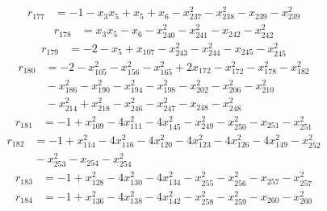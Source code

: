 \[\begin{aligned}
r_{177}&=-1-x_{3}x_{5}+x_{5}+x_{6}-x_{237}^{2}-x_{238}^{2}-x_{239}-x_{239}^{2}
\end{aligned}\]
\[\begin{aligned}
r_{178}&=x_{3}x_{5}-x_{6}-x_{240}^{2}-x_{241}^{2}-x_{242}-x_{242}^{2}
\end{aligned}\]
\[\begin{aligned}
r_{179}&=-2-x_{5}+x_{107}-x_{243}^{2}-x_{244}^{2}-x_{245}-x_{245}^{2}
\end{aligned}\]
\[\begin{aligned}
r_{180}&=-2-x_{105}^{2}-x_{156}^{2}-x_{165}^{2}+2x_{172}-x_{172}^{2}-x_{178}^{2}-x_{182}^{2}\\
&{}-x_{186}^{2}-x_{190}^{2}-x_{194}^{2}-x_{198}^{2}-x_{202}^{2}-x_{206}^{2}-x_{210}^{2}\\
&{}-x_{214}^{2}+x_{218}^{2}-x_{246}^{2}-x_{247}^{2}-x_{248}-x_{248}^{2}
\end{aligned}\]
\[\begin{aligned}
r_{181}&=-1+x_{109}^{2}-4x_{111}^{2}-4x_{145}^{2}-x_{249}^{2}-x_{250}^{2}-x_{251}-x_{251}^{2}
\end{aligned}\]
\[\begin{aligned}
r_{182}&=-1+x_{114}^{2}-4x_{116}^{2}-4x_{120}^{2}-4x_{123}^{2}-4x_{126}^{2}-4x_{149}^{2}-x_{252}^{2}\\
&{}-x_{253}^{2}-x_{254}-x_{254}^{2}
\end{aligned}\]
\[\begin{aligned}
r_{183}&=-1+x_{128}^{2}-4x_{130}^{2}-4x_{134}^{2}-x_{255}^{2}-x_{256}^{2}-x_{257}-x_{257}^{2}
\end{aligned}\]
\[\begin{aligned}
r_{184}&=-1+x_{136}^{2}-4x_{138}^{2}-4x_{142}^{2}-x_{258}^{2}-x_{259}^{2}-x_{260}-x_{260}^{2}
\end{aligned}\]
